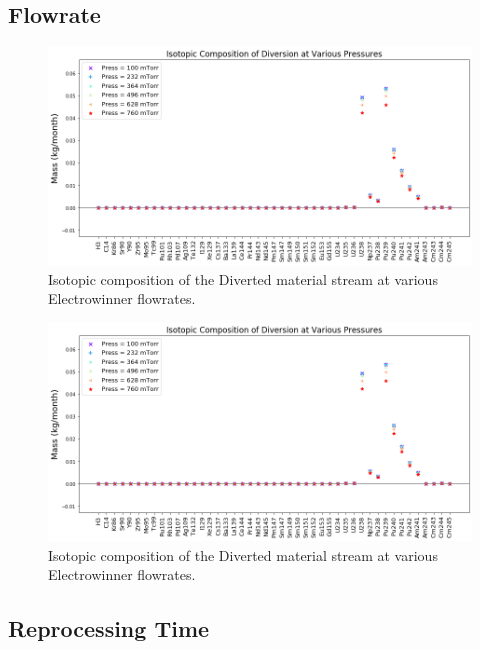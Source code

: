 \subsection{Flowrate}

\begin{figure}
	\includegraphics[width=\linewidth]{images/pressure-sa-comp}
	\caption{Isotopic composition of the Diverted material stream at various Electrowinner flowrates.}
	\label{fig:win-flow-sa}
\end{figure}

\begin{figure}
	\includegraphics[width=\linewidth]{images/pressure-sa-comp}
	\caption{Isotopic composition of the Diverted material stream at various Electrowinner flowrates.}
	\label{fig:win-flow-diff}
\end{figure}

\subsection{Reprocessing Time}

